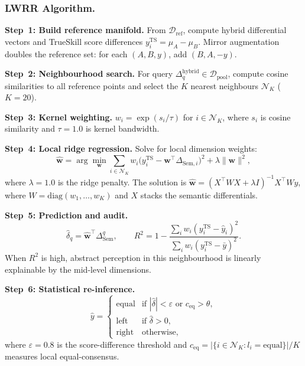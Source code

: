 \documentclass[runningheads]{llncs}
\begin{document}
\subsubsection{LWRR Algorithm.}

\noindent\textbf{Step~1: Build reference manifold.}
From $\mathcal{D}_{\mathrm{ref}}$, compute hybrid differential vectors and TrueSkill score differences $y_i^{\text{TS}}{=}\mu_A{-}\mu_B$.
Mirror augmentation doubles the reference set: for each $(A,B,y)$, add $(B,A,-y)$.

\noindent\textbf{Step~2: Neighbourhood search.}
For query $\Delta_q^{\mathrm{hybrid}} \in \mathcal{D}_{\mathrm{pool}}$, compute cosine similarities to all reference points and select the $K$ nearest neighbours $\mathcal{N}_K$ ($K{=}20$).

\noindent\textbf{Step~3: Kernel weighting.}
$w_i=\exp(s_i/\tau)$ for $i\in\mathcal{N}_K$, where $s_i$ is cosine similarity and $\tau{=}1.0$ is kernel bandwidth.

\noindent\textbf{Step~4: Local ridge regression.}
Solve for local dimension weights:
\begin{equation}
\hat{\mathbf{w}} = \arg\min_{\mathbf{w}} \sum_{i\in\mathcal{N}_K} w_i\bigl(y_i^{\text{TS}}-\mathbf{w}^{\!\top}\Delta_{\text{Sem},i}\bigr)^{2} + \lambda\|\mathbf{w}\|^{2},
\label{eq:lwrr}
\end{equation}
where $\lambda{=}1.0$ is the ridge penalty.
The solution is $\hat{\mathbf{w}}=(X^{\!\top}WX+\lambda I)^{-1}X^{\!\top}Wy$, where $W{=}\mathrm{diag}(w_1,\ldots,w_K)$ and $X$ stacks the semantic differentials.

\noindent\textbf{Step~5: Prediction and audit.}
\begin{equation}
\hat{\delta}_q = \hat{\mathbf{w}}^{\!\top}\Delta_{\text{Sem}}^{q},\qquad
R^{2} = 1-\frac{\sum_{i}w_i(y_i^{\text{TS}}-\hat{y}_i)^{2}}{\sum_{i}w_i(y_i^{\text{TS}}-\bar{y})^{2}}.
\label{eq:r2}
\end{equation}
When $R^{2}$ is high, abstract perception in this neighbourhood is linearly explainable by the mid-level dimensions.

\noindent\textbf{Step~6: Statistical re-inference.}
\begin{equation}
\hat{y} =
\begin{cases}
\text{equal} & \text{if } |\hat{\delta}|<\varepsilon \text{ or } c_{\mathrm{eq}}>\theta, \\
\text{left}  & \text{if } \hat{\delta}>0, \\
\text{right} & \text{otherwise},
\end{cases}
\label{eq:reinfer}
\end{equation}
where $\varepsilon{=}0.8$ is the score-difference threshold and $c_{\mathrm{eq}}{=}|\{i\in\mathcal{N}_K: l_i{=}\text{equal}\}|/K$ measures local equal-consensus.
\end{document}
